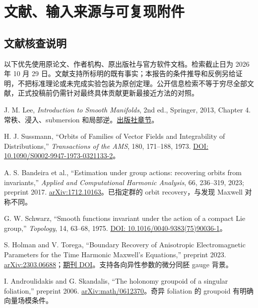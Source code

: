\newpage
\section{文献、输入来源与可复现附件}

\subsection{文献核查说明}

以下优先使用原论文、作者机构、原出版社与官方软件文档。检索截止日为 2026 年 10 月 29 日。文献支持所标明的既有事实；本报告的条件推导和反例另给证明，不把标准理论或未完成实验包装为原创定理。公开信息检索不等于穷尽全部文献，正式投稿前仍需针对最终具体贡献更新最接近方法的对照。

\begin{enumerate}[label={[R\arabic*]},leftmargin=3.1em,itemsep=7pt]
\item J. M. Lee, \emph{Introduction to Smooth Manifolds}, 2nd ed., Springer, 2013, Chapter 4. 常秩、浸入、submersion 和局部逆。\href{https://link.springer.com/chapter/10.1007/978-1-4419-9982-5_4}{出版社章节}。
\item H. J. Sussmann, ``Orbits of Families of Vector Fields and Integrability of Distributions,'' \emph{Transactions of the AMS}, 180, 171--188, 1973. \href{https://doi.org/10.1090/S0002-9947-1973-0321133-2}{DOI: 10.1090/S0002-9947-1973-0321133-2}。
\item A. S. Bandeira et al., ``Estimation under group actions: recovering orbits from invariants,'' \emph{Applied and Computational Harmonic Analysis}, 66, 236--319, 2023; preprint 2017. \href{https://arxiv.org/abs/1712.10163}{arXiv:1712.10163}。已指定群的 orbit recovery，与发现 Maxwell 对称不同。
\item G. W. Schwarz, ``Smooth functions invariant under the action of a compact Lie group,'' \emph{Topology}, 14, 63--68, 1975. \href{https://doi.org/10.1016/0040-9383(75)90036-1}{DOI: 10.1016/0040-9383(75)90036-1}。
\item S. Holman and V. Torega, ``Boundary Recovery of Anisotropic Electromagnetic Parameters for the Time Harmonic Maxwell's Equations,'' preprint 2023. \href{https://arxiv.org/abs/2303.06688}{arXiv:2303.06688}；\href{https://doi.org/10.1007/s12220-023-01499-0}{期刊 DOI}。支持各向异性参数的微分同胚 gauge 背景。
\item I. Androulidakis and G. Skandalis, ``The holonomy groupoid of a singular foliation,'' preprint 2006. \href{https://arxiv.org/abs/math/0612370}{arXiv:math/0612370}。奇异 foliation 的 groupoid 有明确向量场模条件。

\end{enumerate}
